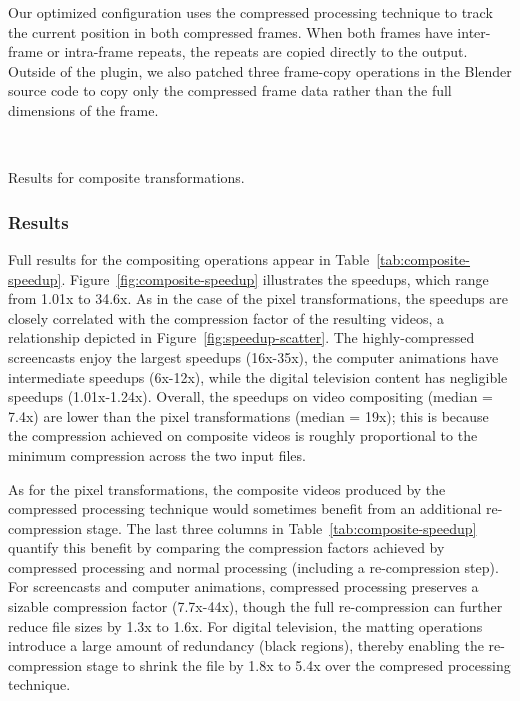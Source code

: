 Our optimized configuration uses the compressed processing technique
to track the current position in both compressed frames.  When both
frames have inter-frame or intra-frame repeats, the repeats are copied
directly to the output.  Outside of the plugin, we also patched three
frame-copy operations in
the Blender source code to copy only the compressed frame data rather
than the full dimensions of the frame.


\begin{table*}[t]
\begin{minipage}{0.6in}
\mbox{~}
\end{minipage}
\caption{Results for composite transformations.
\protect\label{tab:composite-speedup}}
\end{table*}

\subsubsection{Results}

Full results for the compositing operations appear in
Table~\ref{tab:composite-speedup}.  Figure~\ref{fig:composite-speedup}
illustrates the speedups, which range from 1.01x to 34.6x.  As in the
case of the pixel transformations, the speedups are closely correlated
with the compression factor of the resulting videos, a relationship
depicted in Figure~\ref{fig:speedup-scatter}.  The highly-compressed
screencasts enjoy the largest speedups (16x-35x), the computer
animations have intermediate speedups (6x-12x), while the digital
television content has negligible speedups (1.01x-1.24x).  Overall,
the speedups on video compositing (median = 7.4x) are lower than the
pixel transformations (median = 19x); this is because the compression
achieved on composite videos is roughly proportional to the minimum
compression across the two input files.

As for the pixel transformations, the composite videos produced by the
compressed processing technique would sometimes benefit from an
additional re-compression stage.  The last three columns in
Table~\ref{tab:composite-speedup} quantify this benefit by comparing
the compression factors achieved by compressed processing and normal
processing (including a re-compression step).  For screencasts and
computer animations, compressed processing preserves a sizable
compression factor (7.7x-44x), though the full re-compression can
further reduce file sizes by 1.3x to 1.6x.  For digital television,
the matting operations introduce a large amount of redundancy (black
regions), thereby enabling the re-compression stage to shrink the file
by 1.8x to 5.4x over the compresed processing technique.

